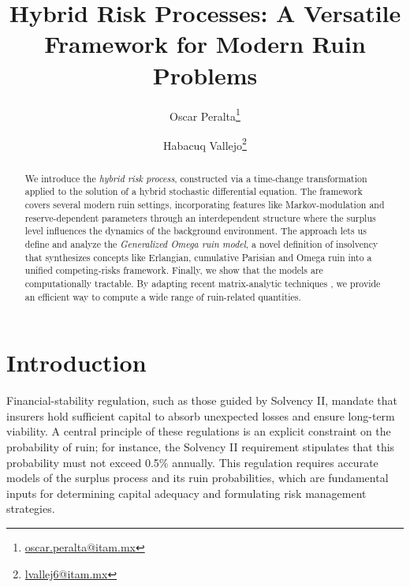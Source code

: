\documentclass[11pt]{article}
\numberwithin{table}{section}
\numberwithin{figure}{section}
\numberwithin{equation}{section}
\newcommand{\1}{{\mathbf 1}}
\newcommand{\0}{\mat{0}}
\begin{document}
\title{Hybrid Risk Processes: A Versatile Framework for Modern Ruin Problems}

\author[1]{Oscar Peralta\thanks{\href{mailto:oscar.peralta@itam.mx}{oscar.peralta@itam.mx}}}
\author[1]{Habacuq Vallejo\thanks{\href{lvallej6@itam.mx}{lvallej6@itam.mx}}} %

\date{}

\maketitle
\begin{abstract}
We introduce the \textit{hybrid risk process}, constructed via a time-change {transformation} applied to the solution of a hybrid stochastic differential equation. The framework covers several modern ruin settings, incorporating features like Markov-modulation and reserve-dependent parameters through an interdependent structure where the surplus level influences the dynamics of the background environment. The approach lets us define and analyze the \textit{Generalized Omega ruin model}, a novel definition of insolvency that synthesizes concepts like Erlangian, cumulative Parisian and Omega ruin into a unified competing-risks framework. Finally, we show that the models are computationally tractable. By adapting recent matrix-analytic techniques \cite{albrecher2022space}, we provide an efficient way to compute a wide range of ruin-related quantities.
\end{abstract}
\section{Introduction}
\label{sec:introduction}

Financial-stability regulation, such as those guided by Solvency II, mandate that insurers hold sufficient capital to absorb unexpected losses and ensure long-term viability. A central principle of these regulations is an explicit constraint on the probability of ruin; for instance, the Solvency II requirement stipulates that this probability {must} not exceed 0.5\% annually. This regulation requires accurate models of the surplus process and its ruin probabilities, which are fundamental inputs for determining capital adequacy and formulating risk management strategies.
\end{document}
